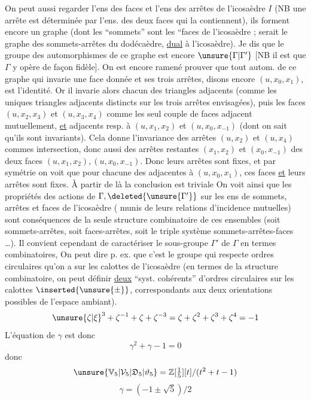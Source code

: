  On peut aussi regarder l'ens des faces et l'ens des arrêtes de l'icosaèdre $I$  (NB une arrête est déterminée par l'ens. des deux faces qui la contiennent), ils forment encore un graphe (dont les ``sommets'' sont les ``faces de l'icosaèdre ;   serait le graphe des sommets-arrêtes du dodécaèdre, \uline{dual} à l'icosaèdre). Je dis que le groupe des automorphismes de ce graphe est encore $\unsure{\Gamma|\Gamma'}$ [NB il est   que $\Gamma$ y opère de façon fidèle]. On est encore ramené  prouver que tout autom. de ce graphe qui  invarie une face donnée et ses trois arrêtes, disons  encore $(u,x_0,x_1)$, est l'identité. Or il invarie alors chacun des  triangles adjacents (comme les uniques triangles adjacents distincts sur les trois arrêtes envisagées),  puis les  faces $(u,x_2,x_3)$ et $(u,x_3,x_4)$ comme les seul couple de faces adjacent mutuellement, \uline{et} adjacents resp. à $(u,x_1,x_2)$ et $(u,x_0,x_{-1})$ (dont on sait qu'ils sont invariants). Cela donne l'invariance des  arrêtes $(u,x_2)$ et $(u,x_4)$ commes intersection, donc aussi des arrêtes restantes $(x_1,x_2)$ et $(x_0,x_{-1})$ des deux  faces $(u,x_1,x_2),(u,x_0,x_{-1})$. Donc leurs arrêtes sont fixes,  et par symétrie on voit que pour chacune des   adjacentes à $(u,x_0,x_1)$,  ces faces \uline{et} leurs arrêtes sont fixes. À partir de là la conclusion est triviale
On voit ainsi que les propriétés des actions de $\Gamma,\deleted{\unsure{\Gamma'}}$ sur les ens de sommets, arrêtes et faces de l'icosaèdre ( munis de leurs relations d'incidence mutuelles) sont conséquences de la seule structure combinatoire de ces ensembles (soit  sommets-arrêtes, soit faces-arrêtes, soit  le triple système sommets-arrêtes-faces \ldots). Il convient cependant de caractériser le sous-groupe $\Gamma'$ de $\Gamma$ en termes combinatoires, On peut dire p. ex. que c'est le groupe qui respecte  ordres circulaires qu'on a sur les  calottes  de  l'icosaèdre (en termes de la structure combinatoire, on peut définir \uline{deux} ``syst. cohérents'' d'ordres circulaires sur les calottes  $\inserted{\unsure{\pm}}$, correspondants aux deux orientations possibles de l'espace ambiant).
\[
\unsure{\zeta|\xi}^3+\zeta^{-1}+\zeta+\zeta^{-3}=\zeta+\zeta^2+\zeta^3+\zeta^4=-1
\]
L'équation de $\gamma$ est donc
\[
\boxed{\gamma^2+\gamma-1=0}
\]
donc
\[
\unsure{\mathbb V_5|\mathcal V_5|\mathfrak D_5|\vartheta_5}=\mathbb Z[\tfrac15][t]/(t^2+t-1)
\]
\[
\boxed{\gamma=(-1\pm\sqrt5)/2}
\]

